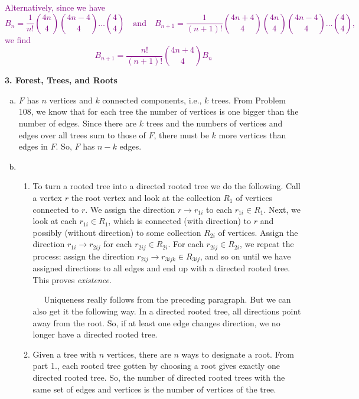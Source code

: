 \documentclass[11pt]{article}
\newcommand{\f}[2]{\frac{#1}{#2}}
\begin{document}
\textcolor{purple}{Alternatively, since we have 
\begin{equation*}
B_n = \f{1}{n!}{4n \choose 4}{{4n-4}\choose 4}\dots  {{4}\choose 4} \quad \text{and} \quad
B_{n+1} = \f{1}{(n+1)!}{4n+4 \choose 4}{{4n}\choose 4}{{4n-4}\choose 4}\dots  {{4}\choose 4},
\end{equation*}
we find
\begin{equation*}
\boxed{B_{n+1} = \f{n!}{(n+1)!}{4n+4 \choose 4} B_n}
\end{equation*}}




\newpage




\noindent \textbf{3. Forest, Trees, and Roots}

\begin{enumerate}[(a)]
	\item $F$ has $n$ vertices and $k$ connected components, i.e., $k$ trees. From Problem 108, we know that for each tree the number of vertices is one bigger than the number of edges. Since there are $k$ trees and the numbers of vertices and edges over all trees sum to those of $F$, there must be $k$ more vertices than edges in $F$. So, $F$ has $\boxed{n-k}$ edges.
	
	
	\item 
	\begin{enumerate}[1.]
		\item To turn a rooted tree into a directed rooted tree we do the following. Call a vertex $r$ the root vertex and look at the collection $R_1$ of vertices connected to $r$. We assign the direction $r\to r_{1i}$ to each $r_{1i}\in R_1$. Next, we look at each $r_{1i}\in R_1$, which is connected (with direction) to $r$ and possibly (without direction) to some  collection $R_{2i}$ of vertices. Assign the direction $r_{1i}\to r_{2ij}$ for each $r_{2ij}\in R_{2i}$. For each $r_{2ij}\in R_{2i}$, we repeat the process: assign the direction $r_{2ij}\to r_{3ijk}\in R_{3ij}$, and so on until we have assigned directions to all edges and end up with a directed rooted tree. This proves \textit{existence}. 
		
		\indent $\quad$ Uniqueness really follows from the preceding paragraph. But we can also get it the following way. In a directed rooted tree, all directions point away from the root. So, if at least one edge changes direction, we no longer have a directed rooted tree. 
		
		\item Given a tree with $n$ vertices, there are $n$ ways to designate a root. From part 1., each rooted tree gotten by choosing a root gives exactly one directed rooted tree. So, the number of directed rooted trees with the same set of edges and vertices is the $\boxed{\text{number of vertices of the tree.}}$
	\end{enumerate}


\end{enumerate}
\end{document}
